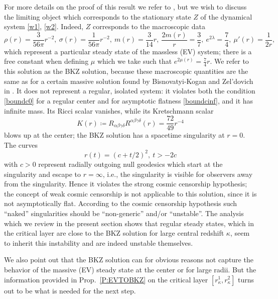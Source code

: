 \documentclass[11pt]{article}
\begin{document}
%
For more details on the proof of this result we refer to
\cite[Props.~3.13, 3.14]{HaLinRe},
but we wish to discuss the limiting object which corresponds to the stationary
state $Z$ of the dynamical system \eqref{w1}, \eqref{w2}.
Indeed, $Z$ corresponds to the macroscopic data
\[
\rho(r) = \frac{3}{56 \pi} r^{-2},\ \sigma(r) = \frac{1}{56 \pi} r^{-2},\
m(r) = \frac{3}{14} r,\ \frac{2m(r)}{r} =  \frac{3}{7},\
e^{2\lambda} = \frac{7}{4},\ \mu'(r) = \frac{1}{2 r},
\]
which represent a particular steady state of the massless (EV) system; there is
a free constant when defining $\mu$ which we take such that
$e^{2\mu(r)} = \frac{7}{4} r$.
We refer to this solution as the BKZ solution, because these
macroscopic quantities are the same as for a certain massive solution
found by {\sc  Bisnovatyi-Kogan} and {\sc Zel'dovich} in \cite{BKZ}. 
It does not represent a regular, isolated system:
it violates both the condition \eqref{boundc0} for a regular center and
for asymptotic flatness \eqref{boundcinf}, and it
has infinite mass. 
Its Ricci scalar vanishes, while its Kretschmann scalar
\[
K(r) \coloneqq R_{\alpha\beta\gamma\delta} R^{\alpha\beta\gamma\delta}(r)
= \frac{72}{49} r^{-4}
\]
blows up at the center;
the BKZ solution has a spacetime singularity at $r=0$.
The curves
\[
r(t) = (c + t/2)^2,\
t > - 2c
\]
with $c>0$ represent radially outgoing null geodesics which start
at the singularity and escape to $r=\infty$, i.e.,
the singularity is visible for observers away from the singularity.
Hence it violates the strong cosmic censorship hypothesis;
the concept of weak cosmic censorship is not applicable to this solution,
since it is not asymptotically flat. According to the
cosmic censorship hypothesis such ``naked'' singularities
should be ``non-generic'' and/or ``unstable''.
The analysis which we review in the present section shows
that regular steady states, which in the critical layer are
close to the BKZ solution
for large central redshift $\kappa$, seem to inherit this instability and are
indeed unstable themselves.

We also point out that the BKZ solution can for obvious reasons not capture
the behavior of the massive (EV) steady state at the center or for
large radii. But the information provided in Prop.~\ref{P:EVTOBKZ}
on the critical layer $[r_\kappa^1, r_\kappa^2]$ turns out to be what is needed
for the next step.
%
%
\end{document}
